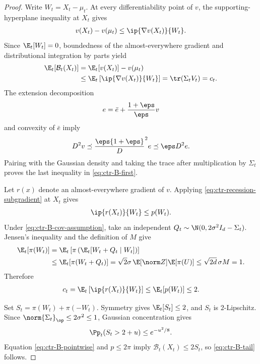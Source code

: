 \begin{proof}
    Write $W_t=X_t-\mu_t$.  At every differentiability point of $v$, the
    supporting-hyperplane inequality at $X_t$ gives
    \begin{align}
        v(X_t)-v(\mu_t)
        \leq\ip{\nabla v(X_t)}{W_t}.
    \end{align}
    Since $\E_t[W_t]=0$, boundedness of the almost-everywhere gradient and
    distributional integration by parts yield
    \begin{align}
        \E_t[\mathcal B_t(X_t)]
         & =\E_t[v(X_t)]-v(\mu_t)
        \\
         & \leq\E_t\left[\ip{\nabla v(X_t)}{W_t}\right]
        =\tr(\Sigma_tV_t)=c_t.
        \label{eq:ctr-B-IBP}
    \end{align}
    The extension decomposition
    \begin{align}
        e=\bar e+\frac{1+\eps}{\eps}v
    \end{align}
    and convexity of $\bar e$ imply
    \begin{align}
        D^2v\preceq\frac\eps{1+\eps}D^2e\preceq\eps D^2e.
    \end{align}
    Pairing with the Gaussian density and taking the trace after multiplication
    by $\Sigma_t$ proves the last inequality in \eqref{eq:ctr-B-first}.

    Let $r(x)$ denote an almost-everywhere gradient of $v$.  Applying
    \eqref{eq:ctr-recession-subgradient} at $X_t$ gives
    \begin{align}
        \ip{r(X_t)}{W_t}\leq p(W_t).
    \end{align}
    Under \eqref{eq:ctr-B-cov-assumption}, take an independent
    $Q_t\sim\N(0,2\sigma^2I_d-\Sigma_t)$.  Jensen's inequality and the
    definition of $M$ give
    \begin{align}
        \E_t[\pi(W_t)]
         & =\E_t\left[\pi\left(\E_t[W_t+Q_t\mid W_t]\right)\right]
        \\
         & \leq\E_t[\pi(W_t+Q_t)]
        =\sqrt2\sigma\,\E[\norm Z]\E[\pi(U)]
        \leq\sqrt{2d}\,\sigma M=1.
        \label{eq:ctr-pi-mean}
    \end{align}
    Therefore
    \begin{align}
        c_t
        =\E_t\left[\ip{r(X_t)}{W_t}\right]
        \leq\E_t[p(W_t)]\leq2.
    \end{align}

    Set $S_t=\pi(W_t)+\pi(-W_t)$.  Symmetry gives
    $\E_t[S_t]\leq2$, and $S_t$ is $2$-Lipschitz.  Since
    $\norm{\Sigma_t}_{\op}\leq2\sigma^2\leq1$, Gaussian concentration gives
    \begin{align}
        \Pp_t(S_t>2+u)\leq e^{-u^2/8}.
        \label{eq:ctr-S-tail}
    \end{align}
    Equation \eqref{eq:ctr-B-pointwise} and
    $p\leq2\pi$ imply $\mathcal B_t(X_t)\leq2S_t$, so
    \eqref{eq:ctr-B-tail} follows.


\end{proof}
